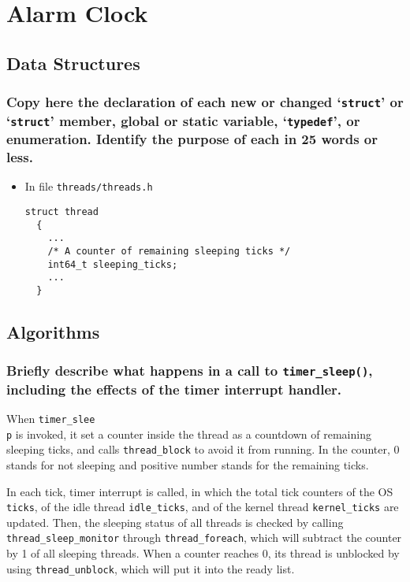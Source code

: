 \documentclass[sigconf, nonacm]{acmart}
\begin{document}
    \section{Alarm Clock}
    
        \subsection{Data Structures}
        
            \subsubsection{Copy here the declaration of each new or changed `\texttt{struct}' or `\texttt{struct}' member, global or static variable, `\texttt{typedef}', or enumeration. Identify the purpose of each in 25 words or less. } 
            
                \begin{itemize}
                    \item In file \texttt{threads/threads.h}
\begin{verbatim}
struct thread
  {
    ...
    /* A counter of remaining sleeping ticks */
    int64_t sleeping_ticks;
    ...
  }\end{verbatim}
                \end{itemize}
        
        \subsection{Algorithms}
        
            \subsubsection{Briefly describe what happens in a call to \texttt{timer\_sleep()}, including the effects of the timer interrupt handler. }
                When \texttt{timer\_slee\\p} is invoked, it set a counter inside the thread as a countdown of remaining sleeping ticks, and calls \texttt{thread\_block} to avoid it from running. In the counter, 0 stands for not sleeping and positive number stands for the remaining ticks.
            
                In each tick, timer interrupt is called, in which the total tick counters of the OS \texttt{ticks}, of the idle thread \texttt{idle\_ticks}, and of the kernel thread \texttt{kernel\_ticks} are updated. Then, the sleeping status of all threads is checked by calling \texttt{thread\_sleep\_monitor} through \texttt{thread\_foreach}, which will subtract the counter by 1 of all sleeping threads. When a counter reaches 0, its thread is unblocked by using \texttt{thread\_unblock}, which will put it into the ready list. 
            
\end{document}
